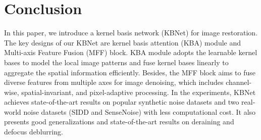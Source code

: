 \documentclass[default,iicol]{sn-jnl}
\theoremstyle{thmstyleone}\newtheorem{theorem}{Theorem}\newtheorem{proposition}[theorem]{Proposition}
\theoremstyle{thmstyletwo}\newtheorem{example}{Example}\newtheorem{remark}{Remark}
\theoremstyle{thmstylethree}\newtheorem{definition}{Definition}
\begin{document}
\section{Conclusion}
In this paper, we introduce a kernel basis network (KBNet) for image restoration. 
The key designs of our KBNet are kernel basis attention (KBA) module and Multi-axis  Feature Fusion (MFF) block. KBA module adopts the learnable kernel bases to model the local image patterns and fuse kernel bases linearly to aggregate the spatial information efficiently. 
Besides, the MFF block aims to fuse diverse features from multiple axes for image denoising, which includes channel-wise, spatial-invariant, and pixel-adaptive processing.
In the experiments, KBNet achieves state-of-the-art results on popular synthetic noise datasets and two real-world noise datasets (SIDD and SenseNoise) with less computational cost. It also presents good generalizations and state-of-the-art results on deraining and defocus deblurring.





\backmatter













































\end{document}
